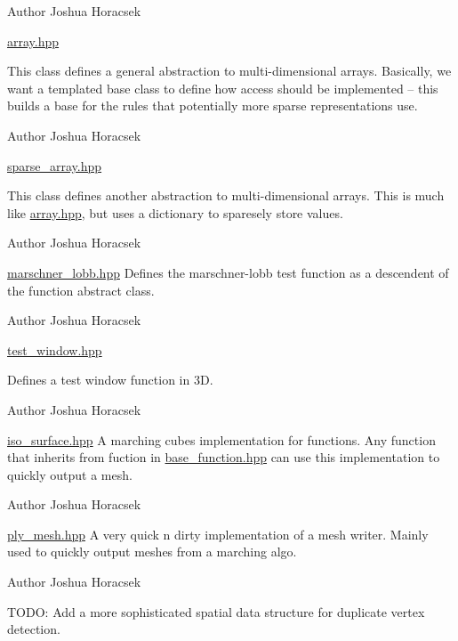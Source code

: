 \begin{DoxyAuthor}{Author}
Joshua Horacsek
\end{DoxyAuthor}
\hyperlink{array_8hpp_source}{array.\+hpp}

This class defines a general abstraction to multi-\/dimensional arrays. Basically, we want a templated base class to define how access should be implemented -- this builds a base for the rules that potentially more sparse representations use.

\begin{DoxyAuthor}{Author}
Joshua Horacsek
\end{DoxyAuthor}
\hyperlink{sparse__array_8hpp_source}{sparse\+\_\+array.\+hpp}

This class defines another abstraction to multi-\/dimensional arrays. This is much like \hyperlink{array_8hpp_source}{array.\+hpp}, but uses a dictionary to sparesely store values.

\begin{DoxyAuthor}{Author}
Joshua Horacsek
\end{DoxyAuthor}
\hyperlink{marschner__lobb_8hpp_source}{marschner\+\_\+lobb.\+hpp} Defines the marschner-\/lobb test function as a descendent of the function abstract class.

\begin{DoxyAuthor}{Author}
Joshua Horacsek
\end{DoxyAuthor}
\hyperlink{test__window_8hpp_source}{test\+\_\+window.\+hpp}

Defines a test window function in 3D.

\begin{DoxyAuthor}{Author}
Joshua Horacsek
\end{DoxyAuthor}
\hyperlink{iso__surface_8hpp_source}{iso\+\_\+surface.\+hpp} A marching cubes implementation for functions. Any function that inherits from fuction in \hyperlink{base__function_8hpp_source}{base\+\_\+function.\+hpp} can use this implementation to quickly output a mesh.

\begin{DoxyAuthor}{Author}
Joshua Horacsek
\end{DoxyAuthor}
\hyperlink{ply__mesh_8hpp_source}{ply\+\_\+mesh.\+hpp} A very quick n\textquotesingle{} dirty implementation of a mesh writer. Mainly used to quickly output meshes from a marching algo.

\begin{DoxyAuthor}{Author}
Joshua Horacsek
\end{DoxyAuthor}
T\+O\+DO\+: Add a more sophisticated spatial data structure for duplicate vertex detection. 


